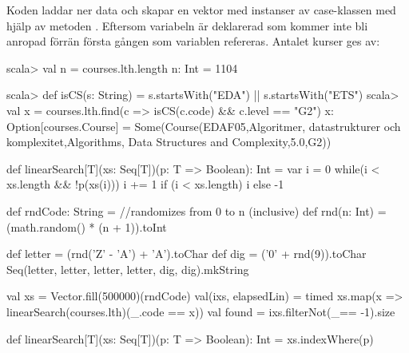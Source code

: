 \SubtaskSolved
Koden laddar ner data och skapar en vektor med instanser av case-klassen  med hjälp av metoden . Eftersom variabeln  är deklarerad som  kommer inte  bli anropad förrän första gången som variablen  refereras. Antalet kurser ges av:
\begin{REPLnonum}
scala> val n = courses.lth.length
n: Int = 1104
\end{REPLnonum}

\SubtaskSolved
\begin{REPL}
scala> def isCS(s: String) = s.startsWith("EDA") || s.startsWith("ETS")
scala> val x = courses.lth.find(c => isCS(c.code) && c.level == "G2")
x: Option[courses.Course] = Some(Course(EDAF05,Algoritmer, datastrukturer och
   komplexitet,Algorithms, Data Structures and Complexity,5.0,G2))
\end{REPL}

\SubtaskSolved
\begin{Code}
def linearSearch[T](xs: Seq[T])(p: T => Boolean): Int = 
   var i = 0
   while(i < xs.length && !p(xs(i))) i += 1
   if (i < xs.length) i else -1
\end{Code}

\SubtaskSolved

\begin{Code}
def rndCode: String = 
   //randomizes from 0 to n (inclusive)
   def rnd(n: Int) = (math.random() * (n + 1)).toInt

   def letter = (rnd('Z' - 'A') + 'A').toChar
   def dig = ('0' + rnd(9)).toChar
   Seq(letter, letter, letter, letter, dig, dig).mkString
\end{Code}

\SubtaskSolved

\begin{Code}
val xs = Vector.fill(500000)(rndCode)
val(ixs, elapsedLin) =
  timed { xs.map(x => linearSearch(courses.lth)(_.code == x)) }
val found = ixs.filterNot(_== -1).size
\end{Code}

\SubtaskSolved

\begin{Code}
def linearSearch[T](xs: Seq[T])(p: T => Boolean): Int = xs.indexWhere(p)
\end{Code}



\QUESTEND

